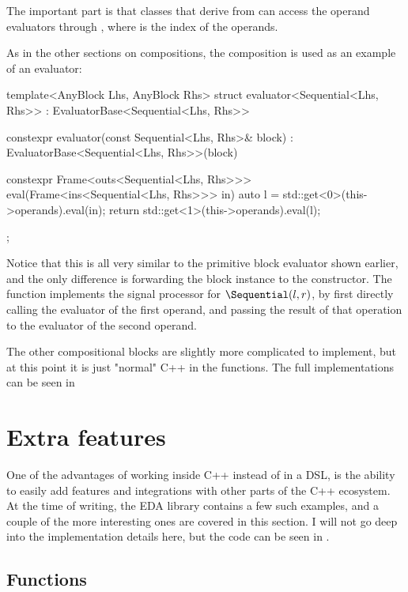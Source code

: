 The important part is that classes that derive from  can access the operand evaluators
through , where  is the index of the operands.

As in the other sections on compositions, the \Sequential composition is used as an example of an evaluator:

\begin{cppcodenl}
  template<AnyBlock Lhs, AnyBlock Rhs>
  struct evaluator<Sequential<Lhs, Rhs>> : EvaluatorBase<Sequential<Lhs, Rhs>> {
    constexpr evaluator(const Sequential<Lhs, Rhs>& block) : EvaluatorBase<Sequential<Lhs, Rhs>>(block) {}

    constexpr Frame<outs<Sequential<Lhs, Rhs>>> eval(Frame<ins<Sequential<Lhs, Rhs>>> in)
    {
      auto l = std::get<0>(this->operands).eval(in);
      return std::get<1>(this->operands).eval(l);
    }
  };
\end{cppcodenl}

Notice that this is all very similar to the primitive block evaluator shown earlier, and the only difference
is forwarding the block instance to the  constructor.  The  function implements the signal processor
for $\Sequential(l, r)$, by first directly calling the evaluator of the first operand, and passing the
result of that operation to the evaluator of the second operand.

The other compositional blocks are slightly more complicated to implement, but at this point it is just
"normal" C++ in the  functions. The full implementations can be seen in 

\section{Extra features}

One of the advantages of working inside C++ instead of in a DSL, is the ability to easily add features and
integrations with other parts of the C++ ecosystem. At the time of writing, the EDA library contains a few
such examples, and a couple of the more interesting ones are covered in this section. I will not go deep into
the implementation details here, but the code can be seen in .

\subsection{Functions}


